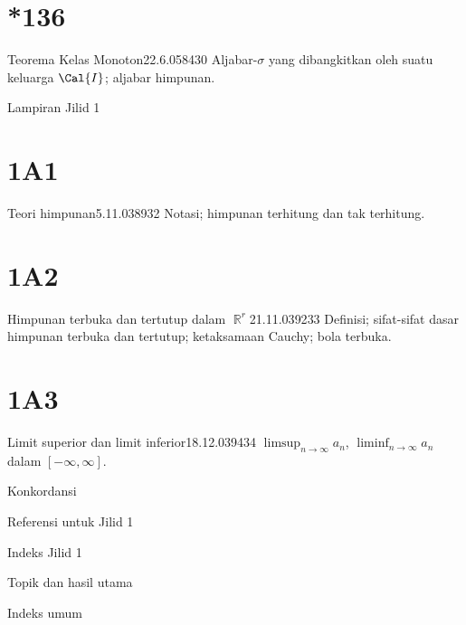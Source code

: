 \section{*136}{Teorema Kelas Monoton}{22.6.05}{84}{30}
{Aljabar-$\sigma$ yang dibangkitkan oleh suatu keluarga $\Cal{I}$;
aljabar himpunan.}

\medskip

 Lampiran Jilid 1


\section{1A1}{Teori himpunan}{5.11.03}{89}{32}
{Notasi;  himpunan terhitung dan tak terhitung.}

\section{1A2}{Himpunan terbuka dan tertutup dalam $\BbbR^r$}{21.11.03}{92}{33}
{Definisi;  sifat-sifat dasar himpunan terbuka dan tertutup;  ketaksamaan
Cauchy;  bola terbuka.}

\section{1A3}{Limit superior dan limit inferior}{18.12.03}{94}{34}
{$\limsup_{n\to\infty}a_n$, $\liminf_{n\to\infty}a_n$ dalam
$[-\infty,\infty]$.}


Konkordansi 

\medskip

Referensi untuk Jilid 1 

\medskip
     
Indeks Jilid 1
     
\qquad Topik dan hasil utama 
     
\qquad Indeks umum 
     
